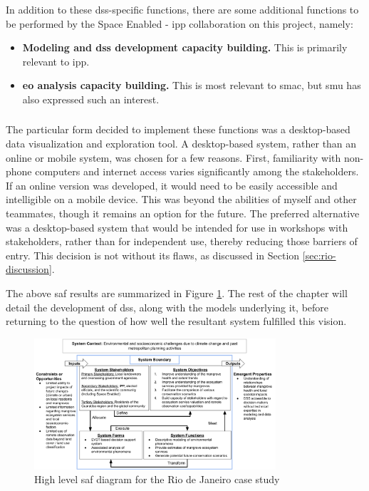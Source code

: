 In addition to these \ac{dss}-specific functions, there are some additional functions to be performed by the Space Enabled - \ac{ipp} collaboration on this project, namely:

\begin{itemize}[itemsep=0pt,parsep=0pt]
    \item{\textbf{Modeling and \ac{dss} development capacity building.} This is primarily relevant to \ac{ipp}.}
    \item{\textbf{\ac{eo} analysis capacity building.} This is most relevant to \ac{smac}, but \ac{smu} has also expressed such an interest.}
\end{itemize}


\subsubsection{}

The particular form decided to implement these functions was a desktop-based data visualization and exploration tool. A desktop-based system, rather than an online or mobile system, was chosen for a few reasons. First, familiarity with non-phone computers and internet access varies significantly among the stakeholders. If an online version was developed, it would need to be easily accessible and intelligible on a mobile device. This was beyond the abilities of myself and other teammates, though it remains an option for the future. The preferred alternative was a desktop-based system that would be intended for use in workshops with stakeholders, rather than for independent use, thereby reducing those barriers of entry. This decision is not without its flaws, as discussed in Section \ref{sec:rio-discussion}. 

The above \ac{saf} results are summarized in Figure \ref{fig:system-diagram-rio}. The rest of the chapter will detail the development of \ac{dss}, along with the models underlying it, before returning to the question of how well the resultant system fulfilled this vision.

\begin{figure}[!htb] 
\centering
\includegraphics[width=0.8\textwidth]{Figures/chap4/system-diagram-rio.png}
\caption[High level Systems Architecture Framework diagram for the Rio de Janeiro case study]{High level \ac{saf} diagram for the Rio de Janeiro case study}
\label{fig:system-diagram-rio}
\end{figure}

